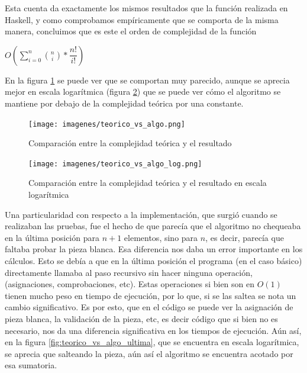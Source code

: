 \documentclass[11pt,a4paper]{article}
\begin{document}
Esta cuenta da exactamente los mismos resultados que la función realizada en Haskell, y como comprobamos empíricamente que se comporta de la misma manera, concluimos que es este el orden de complejidad de la función

\begin{center}

$O (\sum_{i=0}^{n}\binom  {n} {i} * \dfrac{n!}{i!})$

\end{center}

En la figura \ref{fig:teorico_vs_algo} se puede ver que se comportan muy parecido, aunque se aprecia mejor en escala logarítmica (figura \ref{fig:teorico_vs_algo_log}) que se puede ver cómo el algoritmo se mantiene por debajo de la complejidad teórica por una constante.

	\begin{figure}[H]
    	\begin{center}
        	\texttt{[image: imagenes/teorico\_vs\_algo.png]}
    	\end{center}
    	\caption{Comparación entre la complejidad teórica y el resultado}
    	\label{fig:teorico_vs_algo}
	\end{figure}

	\begin{figure}[H]
    	\begin{center}
        	\texttt{[image: imagenes/teorico\_vs\_algo\_log.png]}
    	\end{center}
    	\caption{Comparación entre la complejidad teórica y el resultado en escala logarítmica}
    	\label{fig:teorico_vs_algo_log}
	\end{figure}

Una particularidad con respecto a la implementación, que surgió cuando se realizaban las pruebas, fue el hecho de que parecía que el algoritmo no chequeaba en la última posición para $n+1$ elementos, sino para $n$, es decir, parecía que faltaba probar la pieza blanca. Esa diferencia nos daba un error importante en los cálculos. Esto se debía a que en la última posición el programa (en el caso básico) directamente llamaba al paso recursivo sin hacer ninguna operación, (asignaciones, comprobaciones, etc). Estas operaciones si bien son en $O(1)$ tienen mucho peso en tiempo de ejecución, por lo que, si se las saltea se nota un cambio significativo. Es por esto, que en el código se puede ver la asignación de pieza blanca, la validación de la pieza, etc, es decir código que si bien no es necesario, nos da una diferencia significativa en los tiempos de ejecución. Aún así, en la figura \ref{fig:teorico_vs_algo_ultima}, que se encuentra en escala logarítmica, se aprecia que salteando la pieza, aún así el algoritmo se encuentra acotado por esa sumatoria.
\end{document}

